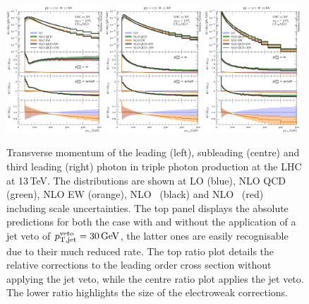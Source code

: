 \begin{figure}[t!]
  \centering
  \includegraphics[width=0.32\textwidth]{figs_aaa/pT_y1}
  \includegraphics[width=0.32\textwidth]{figs_aaa/pT_y2}
  \includegraphics[width=0.32\textwidth]{figs_aaa/pT_y3}
  \caption{
    Transverse momentum of the leading (left), subleading (centre) 
    and third leading (right) photon 
    in triple photon production at the LHC at 13\,TeV. 
    The distributions are shown at LO (blue), NLO QCD (green), 
    NLO EW (orange), NLO \QCDpEW\ (black) and NLO \QCDtEW\ (red) 
    including scale uncertainties. The top panel displays the 
    absolute predictions for both the case with and without the 
    application of a jet veto of $p_\mathrm{T,jet}^\mathrm{veto}=\text{30\,GeV}$, 
    the latter ones are easily recognisable 
    due to their much reduced rate. The top ratio plot details 
    the relative corrections to the leading order cross section 
    without applying the jet veto, while the centre ratio plot 
    applies the jet veto. 
    The lower ratio highlights the size of the electroweak corrections.
    \label{fig:aaa:pt}
  }
\end{figure}

